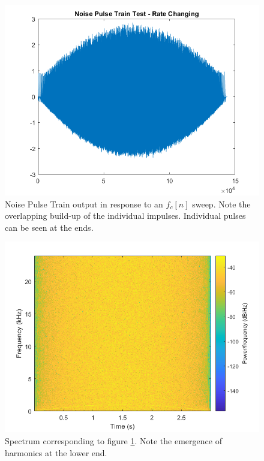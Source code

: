 \documentclass[../main.tex]{subfiles}
\begin{document}
\begin{figure}[h]
    \centering
    \includegraphics[scale=.65]{./images/plots/NPTTest2.png}
    \caption{Noise Pulse Train output in response to an $f_c[n]$ sweep. Note the overlapping build-up of the individual impulses. Individual pulses can be seen at the ends.}
    \label{fig:NPTT2}
\end{figure}

\begin{figure}[h]
    \centering
    \includegraphics[scale=.65]{./images/plots/NPTTest2Spectrum.png}
    \caption{Spectrum corresponding to figure \ref{fig:NPTT2}. Note the emergence of harmonics at the lower end.}
    \label{fig:NPTT2Spec}
\end{figure}
\end{document}
